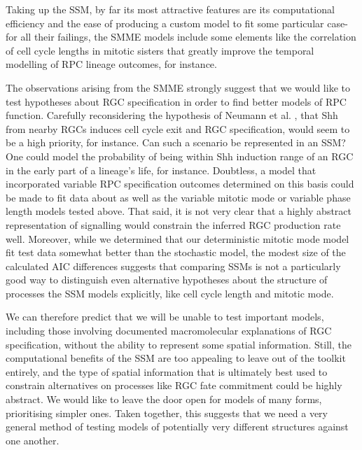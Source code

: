 Taking up the SSM, by far its most attractive features are its computational efficiency and the ease of producing a custom model to fit some particular case- for all their failings, the SMME models include some elements like the correlation of cell cycle lengths in mitotic sisters that greatly improve the temporal modelling of RPC lineage outcomes, for instance.

The observations arising from the SMME strongly suggest that we would like to test hypotheses about RGC specification in order to find better models of RPC function. Carefully reconsidering the hypothesis of Neumann et al. \cite{Neumann2000}, that Shh from nearby RGCs induces cell cycle exit and RGC specification, would seem to be a high priority, for instance. Can such a scenario be represented in an SSM? One could model the probability of being within Shh induction range of an RGC in the early part of a lineage's life, for instance. Doubtless, a model that incorporated variable RPC specification outcomes determined on this basis could be made to fit data about as well as the variable mitotic mode or variable phase length models tested above. That said, it is not very clear that a highly abstract representation of signalling would constrain the inferred RGC production rate well. Moreover, while we determined that our deterministic mitotic mode model fit test data somewhat better than the stochastic model, the modest size of the calculated AIC differences suggests that comparing SSMs is not a particularly good way to distinguish even alternative hypotheses about the structure of processes the SSM models explicitly, like cell cycle length and mitotic mode. 

We can therefore predict that we will be unable to test important models, including those involving documented macromolecular explanations of RGC specification, without the ability to represent some spatial information. Still, the computational benefits of the SSM are too appealing to leave out of the toolkit entirely, and the type of spatial information that is ultimately best used to constrain alternatives on processes like RGC fate commitment could be highly abstract. We would like to leave the door open for models of many forms, prioritising simpler ones. Taken together, this suggests that we need a very general method of testing models of potentially very different structures against one another.

